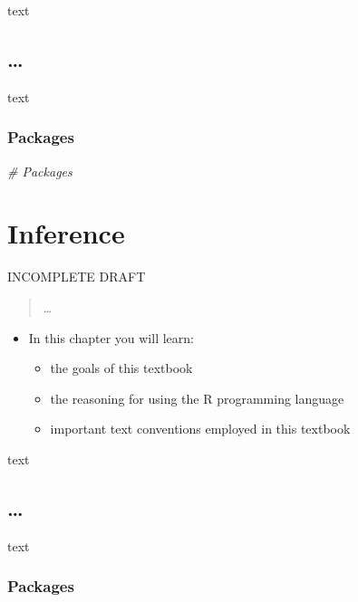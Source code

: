 \documentclass[
]{article}
\newenvironment{Shaded}{\begin{snugshade}}{\end{snugshade}}
\newcommand{\CommentTok}[1]{\textcolor[rgb]{0.56,0.35,0.01}{\textit{#1}}}
\providecommand{\tightlist}{%
  \setlength{\itemsep}{0pt}\setlength{\parskip}{0pt}}
\newenvironment{rmdblock}[1]
  {\begin{shaded*}
  \begin{itemize}
  \renewcommand{\labelitemi}{
    \raisebox{-.5\height}[0pt][0pt]{
      {\setkeys{Gin}{width=2em,keepaspectratio}\texttt{[image: assets/images/\#1]}}
    }
  }
  \item
  }
  {
  \end{itemize}
  \end{shaded*}
  }
\newenvironment{rmdkey}
  {\begin{rmdblock}{key}}
  {\end{rmdblock}}
\begin{document}
text

\hypertarget{section-3}{%
\subsection{\ldots{}}\label{section-3}}

text

\hypertarget{exploration-packages}{%
\subsubsection{Packages}\label{exploration-packages}}

\begin{Shaded}
\begin{Highlighting}[]
\CommentTok{\# Packages}
\end{Highlighting}
\end{Shaded}

\hypertarget{inference}{%
\section{Inference}\label{inference}}

INCOMPLETE DRAFT

\begin{quote}
\ldots{}
\end{quote}

\begin{rmdkey}
In this chapter you will learn:

\begin{itemize}
\tightlist
\item
  the goals of this textbook
\item
  the reasoning for using the R programming language
\item
  important text conventions employed in this textbook
\end{itemize}
\end{rmdkey}

text

\hypertarget{section-4}{%
\subsection{\ldots{}}\label{section-4}}

text

\hypertarget{inference-packages}{%
\subsubsection{Packages}\label{inference-packages}}
\end{document}

